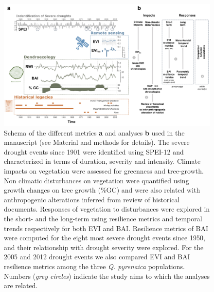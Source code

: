 \begin{figure}
\centering
\includegraphics[width=\textwidth]{img/dendro/dendro-schema.jpg} \caption{Schema of the different metrics \textbf{a} and analyses \textbf{b} used in the manuscript (see Material and methods for details). The severe drought events since 1901 were identified using SPEI-12 and characterized in terms of duration, severity and intensity. Climate impacts on vegetation were assessed for greenness and tree-growth. Non climatic disturbances on vegetation were quantified using growth changes on tree growth (\%GC) and were also related with anthropogenic alterations inferred from review of historical documents. Responses of vegetation to disturbances were explored in the short- and the long-term using resilience metrics and temporal trends respectively for both EVI and BAI. Resilience metrics of BAI were computed for the eight most severe drought events since 1950, and their relationship with drought severity were explored. For the 2005 and 2012 drought events we also compared EVI and BAI resilience metrics among the three \textit{Q. pyrenaica} populations. Numbers (\textit{grey circles}) indicate the study aims to which the analyses are related.}
\label{fig:dendro:schemadendro}
\end{figure}

